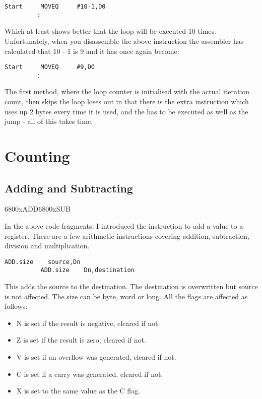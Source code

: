 \begin{lstlisting}[firstnumber=1,]
Start     MOVEQ     #10-1,D0
         :
\end{lstlisting}

Which at least shows better that the loop will be executed 10 times.
    Unfortunately, when you disassemble the above instruction the assembler
    has calculated that 10 -{} 1 is 9 and it has once again become:

\begin{lstlisting}[firstnumber=1,]
Start     MOVEQ     #9,D0
         :
\end{lstlisting}

The first method, where the loop counter is initialised with the
    actual iteration count, then skips the loop loses out in that there is the
    extra  instruction which uses up 2 bytes every time it is used, and
    the  has to be executed as well as the jump -{} all of this takes
    time.

\section{Counting}
\label{ch3-counting}%

\subsection{Adding and Subtracting}\mc6800x{ADD}\mc6800x{SUB}
\label{ch3-adding-subtracting}%

In the above code fragments, I introduced the  instruction to
      add a value to a register. There are a few arithmetic instructions
      covering addition, subtraction, division and multiplication.

\begin{lstlisting}[firstnumber=1,]
          ADD.size    source,Dn
          ADD.size    Dn,destination
\end{lstlisting}

This adds the source to the destination. The destination is
      overwritten but source is not affected. The size can be byte, word or
      long. All the flags are affected as follows:
\begin{itemize}[itemsep=0pt]

\item{}N is set if the result is negative, cleared if not.


\item{}Z is set if the result is zero, cleared if not.


\item{}V is set if an overflow was generated, cleared if not.


\item{}C is set if a carry was generated, cleared if not.


\item{}X is set to the same value as the C flag.

\end{itemize}

